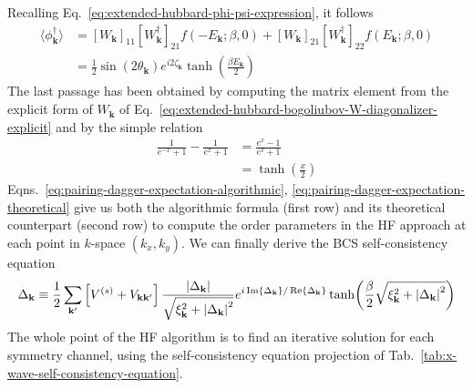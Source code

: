 Recalling Eq.~\eqref{eq:extended-hubbard-phi-psi-expression}, it follows
\begin{align}
	\langle \phi_\mathbf{k}^\dagger \rangle &= [W_\mathbf{k}]_{11} [W_\mathbf{k}^\dagger]_{21} f\left( -E_\mathbf{k}; \beta,0 \right) + [W_\mathbf{k}]_{21} [W_\mathbf{k}^\dagger]_{22} f\left( E_\mathbf{k}; \beta,0 \right) \label{eq:pairing-dagger-expectation-algorithmic} \\
	&= \frac{1}{2} \sin \left(
	2 \theta_\mathbf{k}
	\right) e^{i 2 \zeta_\mathbf{k}} \tanh(\frac{\beta E_\mathbf{k}}{2}) \label{eq:pairing-dagger-expectation-theoretical}
\end{align}
The last passage has been obtained by computing the matrix element from the explicit form of $W_\mathbf{k}$ of Eq.~\eqref{eq:extended-hubbard-bogoliubov-W-diagonalizer-explicit} and by the simple relation
\[
\begin{aligned}
	\frac{1}{e^{-x}+1} - \frac{1}{e^x+1} &= \frac{e^x -1}{e^x +1} \\
	&= \tanh(\frac{x}{2})
\end{aligned}
\]
Eqns.~\eqref{eq:pairing-dagger-expectation-algorithmic}, \eqref{eq:pairing-dagger-expectation-theoretical} give us both the algorithmic formula (first row) and its theoretical counterpart (second row) to compute the order parameters in the HF approach at each point in $k$-space $(k_x,k_y)$. We can finally derive the BCS self-consistency equation
\begin{equation}\label{eq:self-consistency-equation-theoretical}
	\Delta_\mathbf{k} \equiv \frac{1}{2} \sum_{\mathbf{k}'}
	\left[
	V^{(s)} +
	V_{\mathbf{k}\mathbf{k}'}
	\right] \frac{\abs{\Delta_\mathbf{k}}}{\sqrt{\xi_\mathbf{k}^2 + \abs{\Delta_\mathbf{k}}^2}} e^{i \Im{\Delta_\mathbf{k}}/\Re{\Delta_\mathbf{k}}} \tanh(\frac{\beta}{2} \sqrt{\xi_\mathbf{k}^2 + \abs{\Delta_\mathbf{k}}^2})
\end{equation}
The whole point of the HF algorithm is to find an iterative solution for each symmetry channel, using the self-consistency equation projection of Tab.~\ref{tab:x-wave-self-consistency-equation}.

